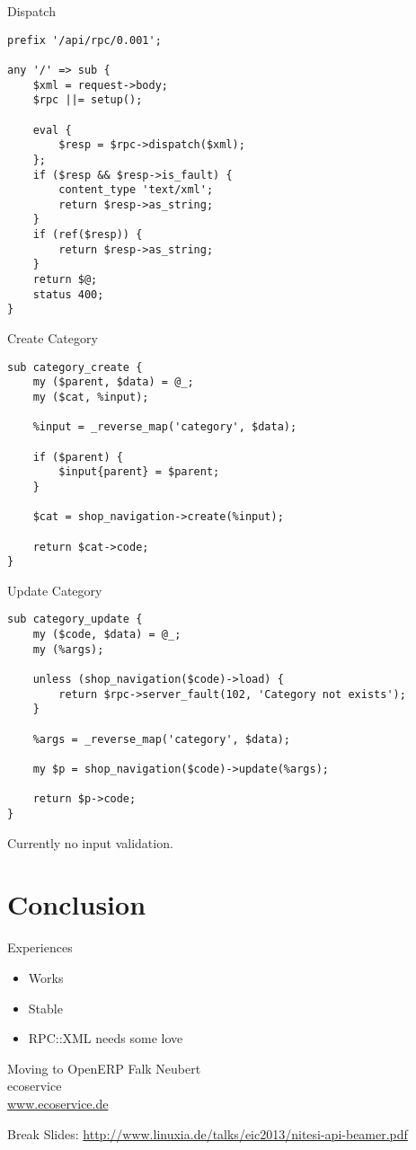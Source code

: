 \begin{frame}[fragile]{Dispatch}
\begin{lstlisting}
prefix '/api/rpc/0.001';

any '/' => sub {
    $xml = request->body;
    $rpc ||= setup();

    eval {
        $resp = $rpc->dispatch($xml);
    };
    if ($resp && $resp->is_fault) {
        content_type 'text/xml';
        return $resp->as_string;
    }
    if (ref($resp)) {
        return $resp->as_string;
    }
    return $@;    
    status 400;
}
\end{lstlisting}
\end{frame}

\begin{frame}[fragile]{Create Category}
\begin{lstlisting}
sub category_create {
    my ($parent, $data) = @_;
    my ($cat, %input);

    %input = _reverse_map('category', $data);

    if ($parent) {
        $input{parent} = $parent;
    }

    $cat = shop_navigation->create(%input);

    return $cat->code;
}
\end{lstlisting}
\end{frame}

\begin{frame}[fragile]{Update Category}
\begin{lstlisting}
sub category_update {
    my ($code, $data) = @_;
    my (%args);

    unless (shop_navigation($code)->load) {
        return $rpc->server_fault(102, 'Category not exists');
    }

    %args = _reverse_map('category', $data);

    my $p = shop_navigation($code)->update(%args);

    return $p->code;
}
\end{lstlisting}
\end{frame}

Currently no input validation.

\section{Conclusion}

\begin{frame}{Experiences}
\begin{itemize}
\item Works
\item Stable
\item RPC::XML needs some love
\end{itemize}
\end{frame}

\begin{frame}{Moving to OpenERP}
Falk Neubert \\
ecoservice \\
\url{www.ecoservice.de}
\end{frame}

\begin{frame}{Break}
Slides:
\url{http://www.linuxia.de/talks/eic2013/nitesi-api-beamer.pdf}
\end{frame}



